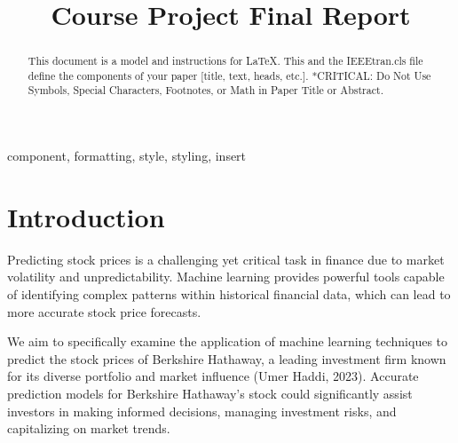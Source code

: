 \documentclass[conference]{IEEEtran}
\begin{document}
\title{Course Project Final Report\\

}

\author{
\and
{}
\and
{}
\and
{}
}

\maketitle

\begin{abstract}
This document is a model and instructions for \LaTeX.
This and the IEEEtran.cls file define the components of your paper [title, text, heads, etc.]. *CRITICAL: Do Not Use Symbols, Special Characters, Footnotes, 
or Math in Paper Title or Abstract.
\end{abstract}

\begin{IEEEkeywords}
component, formatting, style, styling, insert
\end{IEEEkeywords}

\section{Introduction}
Predicting stock prices is a challenging yet critical task in finance due to market volatility and unpredictability. Machine learning provides powerful tools capable of identifying complex patterns within historical financial data, which can lead to more accurate stock price forecasts.

We aim to specifically examine the application of machine learning techniques to predict the stock prices of Berkshire Hathaway, a leading investment firm known for its diverse portfolio and market influence (Umer Haddi, 2023). Accurate prediction models for Berkshire Hathaway's stock could significantly assist investors in making informed decisions, managing investment risks, and capitalizing on market trends.
\end{document}
